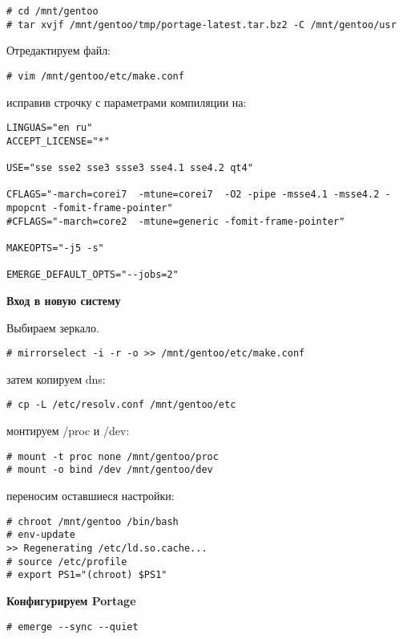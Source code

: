 \documentclass[12pt, a4paper]{article}
\begin{document}
\begin{verbatim}
# cd /mnt/gentoo
# tar xvjf /mnt/gentoo/tmp/portage-latest.tar.bz2 -C /mnt/gentoo/usr
\end{verbatim}

Отредактируем файл:

\begin{verbatim}
# vim /mnt/gentoo/etc/make.conf
\end{verbatim}

исправив строчку с параметрами компиляции на:

\begin{verbatim}
LINGUAS="en ru"
ACCEPT_LICENSE="*"

USE="sse sse2 sse3 ssse3 sse4.1 sse4.2 qt4"

CFLAGS="-march=corei7  -mtune=corei7  -O2 -pipe -msse4.1 -msse4.2 -mpopcnt -fomit-frame-pointer"
#CFLAGS="-march=core2  -mtune=generic -fomit-frame-pointer"

MAKEOPTS="-j5 -s"

EMERGE_DEFAULT_OPTS="--jobs=2"
\end{verbatim}


{\bf Вход в новую систему}


Выбираем зеркало.

\begin{verbatim}
# mirrorselect -i -r -o >> /mnt/gentoo/etc/make.conf
\end{verbatim}

затем копируем dns:

\begin{verbatim}
# cp -L /etc/resolv.conf /mnt/gentoo/etc
\end{verbatim}

монтируем /proc и /dev:

\begin{verbatim}
# mount -t proc none /mnt/gentoo/proc
# mount -o bind /dev /mnt/gentoo/dev
\end{verbatim}

переносим оставшиеся настройки:

\begin{verbatim}
# chroot /mnt/gentoo /bin/bash
# env-update
>> Regenerating /etc/ld.so.cache...
# source /etc/profile
# export PS1="(chroot) $PS1"
\end{verbatim}

{\bf Конфигурируем Portage}

\begin{verbatim}
# emerge --sync --quiet
\end{verbatim}
\end{document}
